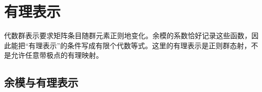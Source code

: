 
\section{有理表示}
\label{b5:sec:2103}


%
%

代数群表示要求矩阵条目随群元素正则地变化。余模的系数恰好记录这些函数，因此能把“有理表示”的条件写成有限个代数等式。这里的有理表示是正则群态射，不是允许任意带极点的有理映射。

\subsection{余模与有理表示}
\label{b5:subsec:2103:01}


